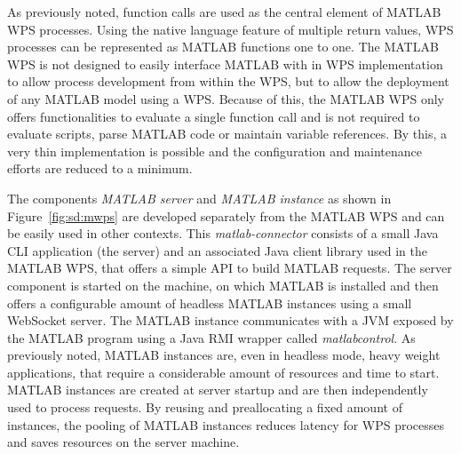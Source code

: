 		As previously noted, function calls are used as the central element of MATLAB WPS processes. Using the native language feature of multiple return values, WPS processes can be represented as MATLAB functions one to one. The MATLAB WPS is not designed to easily interface MATLAB with in WPS implementation to allow process development from within the WPS, but to allow the deployment of any MATLAB model using a WPS. Because of this, the MATLAB WPS only offers functionalities to evaluate a single function call and is not required to evaluate scripts, parse MATLAB code or maintain variable references. By this, a very thin implementation is possible and the configuration and maintenance efforts are reduced to a minimum.

		The components \emph{MATLAB server} and \emph{MATLAB instance} as shown in Figure~\ref{fig:sd:mwps} are developed separately from the MATLAB WPS and can be easily used in other contexts. This \emph{matlab-connector} consists of a small Java CLI application (the server) and an associated Java client library used in the MATLAB WPS, that offers a simple \ac{API} to build MATLAB requests. The server component is started on the machine, on which MATLAB is installed and then offers a configurable amount of headless  MATLAB instances using a small WebSocket server. The MATLAB instance communicates with a \ac{JVM} exposed by the MATLAB program using a Java \ac{RMI} wrapper called \emph{matlabcontrol}. As previously noted, MATLAB instances are, even in headless mode, heavy weight applications, that require a considerable amount of resources and time to start. MATLAB instances are created at server startup and are then independently used to process requests. By reusing and preallocating a fixed amount of instances, the pooling of MATLAB instances reduces latency for WPS processes and saves resources on the server machine.

